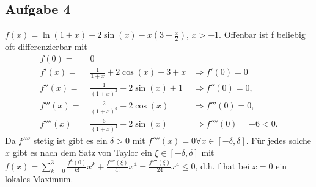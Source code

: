 \documentclass[11pt,a4paper]{article}
\begin{document}
\begin{enumerate}[a)]
      \section*{Aufgabe 4}
        $f(x)=\ln(1+x)+2 \sin(x) - x(3-\frac{x}{2})$, $x>-1$. Offenbar ist f beliebig oft differenzierbar mit
        \begin{align*}
          f(0)=&0\\
          f'(x)=&\frac{1}{1+x}+2\cos(x)-3+x &\Rightarrow f'(0)=0\\
          f''(x)=&\frac{1}{(1+x)^2}-2\sin(x)+1 &\Rightarrow f''(0)=0,\\
          f'''(x)=&\frac{2}{(1+x)^3}-2\cos(x) &\Rightarrow f'''(0)=0,\\
          f''''(x)=&\frac{6}{(1+x)^4} + 2\sin(x) &\Rightarrow f''''(0)=-6<0.
        \end{align*}
      Da $f''''$ stetig ist gibt es ein $\delta>0$ mit $f''''(x)=0 \forall x \in \left[ -\delta,\delta \right]$. Für jedes solche $x$ gibt es nach dem Satz von Taylor ein $\xi \in \left[-\delta,\delta\right]$ mit\\
      $f(x)=\sum\limits_{k=0}^3 \frac{f^{k}(0)}{k!}x^k + \frac{f''''(\xi)}{4!}x^4 = \frac{f''''(\xi)}{24}x^4\leq 0$, d.h. f hat bei $x=0$ ein lokales Maximum.

    \end{enumerate}
\end{document}
